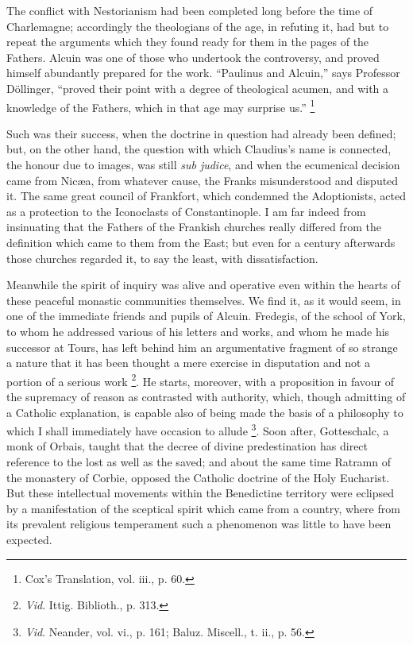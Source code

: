 The conflict with Nestorianism had been completed long before the
time of Charlemagne; accordingly the theologians of the age, in
refuting it, had but to repeat the arguments which they found ready
for them in the pages of the Fathers. Alcuin was one of those who
undertook the controversy, and proved himself abundantly prepared for
the work. ``Paulinus and Alcuin,'' says Professor Döllinger,
``proved their point with a degree of theological acumen, and with
a knowledge of the Fathers, which in that age may surprise us.'' \footnote{Cox's
Translation, vol. iii., p. 60.}

Such was their success, when the doctrine in question had already
been defined; but, on the other hand, the question with which Claudius's
name is connected, the honour due to images, was still \emph{sub judice},
and when the ecumenical decision came from Nicæa, from whatever
cause, the Franks misunderstood and disputed it. The same great
council of Frankfort, which condemned the Adoptionists, acted as a
protection to the Iconoclasts of Constantinople. I am far indeed from
insinuating that the Fathers of the Frankish churches really differed
from the definition which came to them from the East; but even for a
century afterwards those churches regarded it, to say the least, with
dissatisfaction.

Meanwhile the spirit of inquiry was alive and operative even within
the hearts of these peaceful monastic communities themselves. We find
it, as it would seem, in one of the immediate friends and pupils of
Alcuin. Fredegis, of the school of York, to whom he addressed various
of his letters and works, and whom he made his successor at Tours, has
left behind him an argumentative fragment of so strange a nature that
it has been thought a mere exercise in disputation and not a portion
of a serious work \footnote{\emph{Vid}.
Ittig. Biblioth., p. 313.}. He
starts, moreover, with a proposition in favour of the supremacy of
reason as contrasted with authority, which, though admitting of a
Catholic explanation, is capable also of being made the basis of a
philosophy to which I shall immediately have occasion to allude \footnote{\emph{Vid}.
Neander, vol. vi., p. 161; Baluz. Miscell., t. ii., p. 56.}. Soon after, Gotteschalc, a monk of Orbais, taught that the
decree of divine predestination has direct reference to the lost as
well as the saved; and about the same time Ratramn of the monastery of
Corbie, opposed the Catholic doctrine of the Holy Eucharist. But
these intellectual movements within the Benedictine territory were
eclipsed by a manifestation of the sceptical spirit which came from a
country, where from its prevalent religious temperament such a
phenomenon was little to have been expected.

